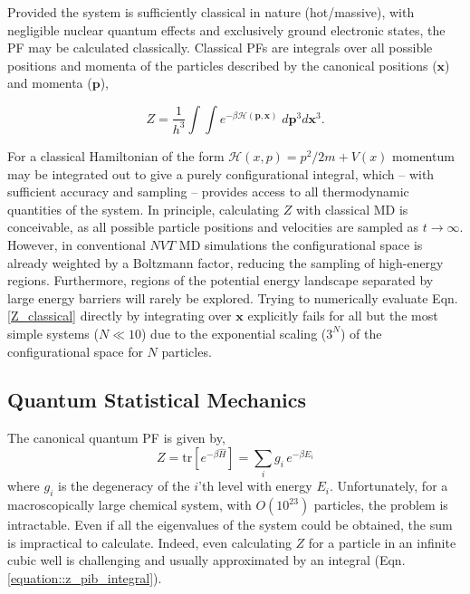 \documentclass[../main.tex]{subfiles}
\begin{document}
Provided the system is sufficiently classical in nature (hot/massive), with negligible nuclear quantum effects and exclusively ground electronic states, the PF may be calculated classically. Classical PFs are integrals over all possible positions and momenta of the particles described by the canonical positions ($\boldsymbol{x}$) and momenta ($\boldsymbol{p}$),\cite{mcquarrie200}

\begin{equation}
	Z = \frac{1}{h^{3}}\int\int e^{-\beta \mathcal{H}(\boldsymbol{p}, \boldsymbol{x})} \; d\boldsymbol{p}^{3} d\boldsymbol{x}^{3}.
	\label{Z_classical}
\end{equation}

For a classical Hamiltonian of the form $\mathcal{H}(x, p) = p^2/2m + V(x)$ momentum may be integrated out to give a purely configurational integral, which -- with sufficient accuracy and sampling -- provides access to all thermodynamic quantities of the system. In principle, calculating $Z$ with classical MD is conceivable, as all possible particle positions and velocities are sampled as $t \rightarrow \infty$. However, in conventional $NVT$ MD simulations the configurational space is already weighted by a Boltzmann factor, reducing the sampling of high-energy regions. Furthermore, regions of the potential energy landscape separated by large energy barriers will rarely be explored. Trying to numerically evaluate Eqn. \eqref{Z_classical} directly by integrating over $\boldsymbol{x}$ explicitly fails for all but the most simple systems ($N \ll 10$) due to the exponential scaling ($3^{N}$) of the configurational space for $N$ particles.



\subsection{Quantum Statistical Mechanics}

The canonical quantum PF is given by,
\begin{equation}
Z = \text{tr}[e^{-\beta \hat{H}}]  = \sum_i g_i \, e^{-\beta E_i}
\label{caonical_pf}
\end{equation}
where $g_i$ is the degeneracy of the $i$'th level with energy $E_i$. Unfortunately, for a macroscopically large chemical system, with $O(10^{23})$ particles, the problem is intractable. Even if all the eigenvalues of the system could be obtained, the sum is impractical to calculate. Indeed, even calculating $Z$ for a particle in an infinite cubic well is challenging and usually approximated by an integral (Eqn. \ref{equation::z_pib_integral}).
\end{document}
